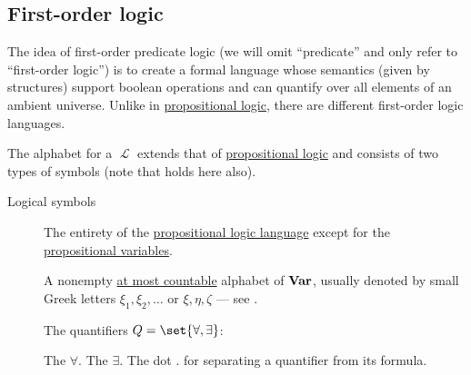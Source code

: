 \subsection{First-order logic}\label{subsec:first_order_logic}

\begin{definition}\label{def:first_order_language}
  The idea of first-order predicate logic (we will omit \enquote{predicate} and only refer to \enquote{first-order logic}) is to create a formal language whose semantics (given by structures) support boolean operations and can quantify over all elements of an ambient universe. Unlike in \hyperref[subsec:propositional_logic]{propositional logic}, there are different first-order logic languages.

  The alphabet for a  \( \mscrL \) extends that of \hyperref[subsec:propositional_logic]{propositional logic} and consists of two types of symbols (note that  holds here also).

  \begin{description}
    \item[Logical symbols]
    \hfill
    \begin{thmenum}[series=def:first_order_language]
       The entirety of the \hyperref[subsec:propositional_logic]{propositional logic language} except for the \hyperref[def:propositional_language/prop]{propositional variables}.

       A nonempty \hyperref[def:set_countability/at_most_countable]{at most countable} alphabet of  \( \operatorname{\mathbf{Var}} \), usually denoted by small Greek letters \( \xi_1, \xi_2, \ldots \) or \( \xi, \eta, \zeta \) --- see .

       The quantifiers \( Q = \set{ \forall, \exists } \):
      \begin{thmenum}
         The  \( \forall \).
         The  \( \exists \).
         The dot \( . \) for separating a quantifier from its formula.
      \end{thmenum}


\end{thmenum}
\end{description}
\end{definition}
